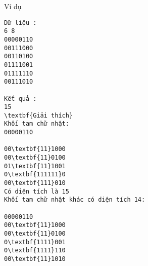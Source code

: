 Ví dụ
\begin{verbatim}
Dữ liệu :
6 8
00000110
00111000
00110100
01111001
01111110
00111010

Kết quả :
15
\textbf{Giải thích}
Khối tam chữ nhật:
00000110

00\textbf{11}1000
00\textbf{11}0100
01\textbf{11}1001
0\textbf{111111}0
00\textbf{111}010
Có diện tích là 15
Khối tam chữ nhật khác có diện tích 14:

00000110
00\textbf{11}1000
00\textbf{11}0100
0\textbf{1111}001
0\textbf{1111}110
00\textbf{11}1010
\end{verbatim}